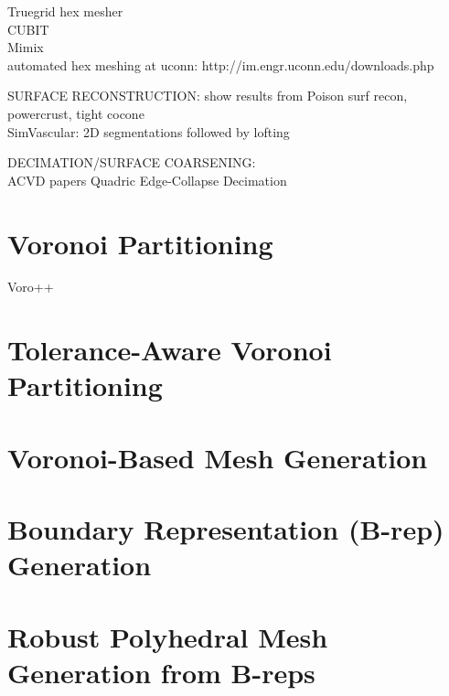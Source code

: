 Truegrid hex mesher \\
CUBIT \\
Mimix \\

automated hex meshing at uconn: http://im.engr.uconn.edu/downloads.php


SURFACE RECONSTRUCTION:
show results from Poison surf recon, powercrust, tight cocone \\

SimVascular: 2D segmentations followed by lofting



DECIMATION/SURFACE COARSENING:\\
ACVD papers
Quadric Edge-Collapse Decimation

\section{Voronoi Partitioning}
\label{Voronoi Partitioning}
Voro++

\section{Tolerance-Aware Voronoi Partitioning}
\label{Tolerance-Aware Voronoi Partitioning}
\section{Voronoi-Based Mesh Generation}
\label{Voronoi-Based Mesh Generation}
\section{Boundary Representation (B-rep) Generation}
\label{Boundary Representation (B-rep) Generation}
\section{Robust Polyhedral Mesh Generation from B-reps}
\label{Robust Polyhedral Mesh Generation from B-reps}
